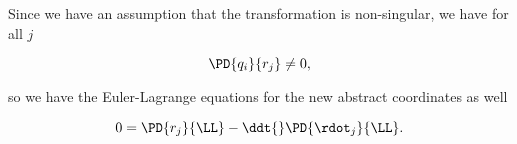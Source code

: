 Since we have an assumption that the transformation is non-singular, we have for all $j$ 

\begin{equation}\label{eqn:classicalMechanicsPs1:440}
\PD{q_i}{r_j} \ne 0,
\end{equation}

so we have the Euler-Lagrange equations for the new abstract coordinates as well

\begin{equation}\label{eqn:classicalMechanicsPs1:460}
0 = \PD{r_j}{\LL} -\ddt{} \PD{\rdot_j}{\LL}.
\end{equation}

\EndArticle
